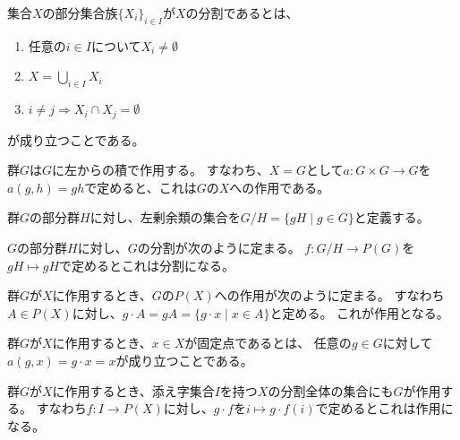 \begin{definition}
    \label{decomposition-def}
    \leanok    
    集合$X$の部分集合族$\{X_i\}_{i\in I}$が$X$の分割であるとは、
    \begin{enumerate}
        \item 任意の$i\in I$について$X_i\neq\emptyset$
        \item $X=\bigcup_{i\in I}X_i$
        \item $i\neq j\Rightarrow X_i\cap X_j=\emptyset$
    \end{enumerate}
    が成り立つことである。
\end{definition}

\begin{proposition}
    \label{left-multiplication}
    群$G$は$G$に左からの積で作用する。
    すなわち、$X=G$として$a:G\times G\to G$を$a(g,h)=gh$で定めると、これは$G$の$X$への作用である。
\end{proposition}

\begin{definition}
    \label{quotient-def}
    群$G$の部分群$H$に対し、左剰余類の集合を$G/H=\{gH\mid g\in G\}$と定義する。
\end{definition}

\begin{proposition}
    \label{subgroup-decomp}
    $G$の部分群$H$に対し、$G$の分割が次のように定まる。
    $f:G/H\to P(G)$を$gH\mapsto gH$で定めるとこれは分割になる。
\end{proposition}

\begin{proposition}
    \label{powerset-action}
    群$G$が$X$に作用するとき、$G$の$P(X)$への作用が次のように定まる。
    すなわち$A\in P(X)$に対し、$g\cdot A=gA=\{g\cdot x\mid x\in A\}$と定める。
    これが作用となる。
\end{proposition}

\begin{proposition}
    \label{fixed-point}
    群$G$が$X$に作用するとき、$x\in X$が固定点であるとは、
    任意の$g\in G$に対して$a(g,x)=g\cdot x=x$が成り立つことである。
\end{proposition}

\begin{proposition}
    \label{decomp-action}
    群$G$が$X$に作用するとき、添え字集合$I$を持つ$X$の分割全体の集合にも$G$が作用する。
    すなわち$f:I\to P(X)$に対し、$g\cdot f$を$i\mapsto g\cdot f(i)$で定めるとこれは作用になる。
\end{proposition}

